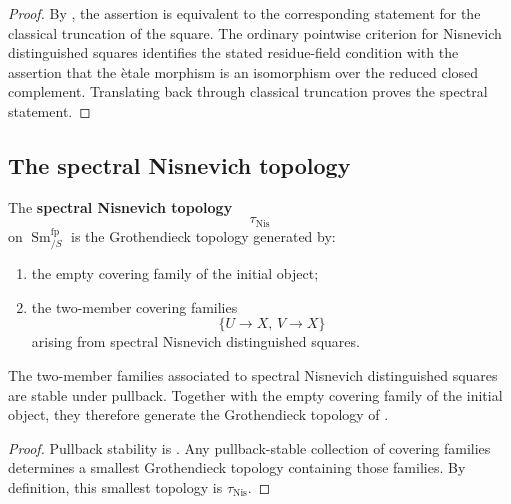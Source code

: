 \begin{proof}
By , the assertion is equivalent
to the corresponding statement for the classical truncation of the
square. The ordinary pointwise criterion for Nisnevich distinguished
squares identifies the stated residue-field condition with the assertion
that the \`etale morphism is an isomorphism over the reduced closed
complement. Translating back through classical truncation proves the
spectral statement.
\end{proof}

\subsection{The spectral Nisnevich topology}

\begin{definition}
\label{def:spectral-nisnevich-topology}
The \textbf{spectral Nisnevich topology}
\[
    \tau_{\mathrm{Nis}}
\]
on $\operatorname{Sm}^{\mathrm{fp}}_{/S}$ is the Grothendieck topology
generated by:
\begin{enumerate}[label=(\roman*)]
    \item the empty covering family of the initial object;

    \item the two-member covering families
    \[
        \{U\to X,\,V\to X\}
    \]
    arising from spectral Nisnevich distinguished squares.
\end{enumerate}
\end{definition}

\begin{proposition}
\label{prop:nisnevich-pretopology}
The two-member families associated to spectral Nisnevich distinguished
squares are stable under pullback. Together with the empty covering
family of the initial object, they therefore generate the Grothendieck
topology of .
\end{proposition}

\begin{proof}
Pullback stability is . Any
pullback-stable collection of covering families determines a smallest
Grothendieck topology containing those families. By definition, this
smallest topology is $\tau_{\mathrm{Nis}}$.
\end{proof}

